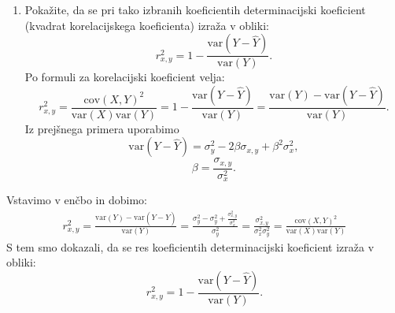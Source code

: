 \documentclass[a4paper]{article}
\begin{document}
\begin{enumerate}[label=(\alph*)]
\item Pokažite, da se pri tako izbranih koeficientih determinacijski koeficient (kvadrat korelacijskega koeficienta) izraža v obliki:
$$ r_{x,y}^2 = 1 - \frac{\text{var}(Y - \hat{Y})}{\text{var}(Y)}. $$
Po formuli za korelacijski koeficient velja:
$$ r_{x,y}^2 = \frac{\text{cov}(X,Y)^2}{\text{var}(X) \text{var}(Y)} = 1 - \frac{\text{var}(Y - \hat{Y})}{\text{var}(Y)} = \frac{\text{var}(Y) - \text{var}(Y - \hat{Y})}{\text{var}(Y)}. $$
Iz prejšnega primera uporabimo
$$ \text{var}(Y-\hat{Y}) = \sigma_y^2 - 2 \beta \sigma_{x,y} + \beta^2 \sigma_x^2,$$
$$ \beta = \frac{\sigma_{x,y}}{\sigma_x^2}.$$
\end{enumerate}
Vstavimo v enčbo in dobimo:
\begin{multline*}
 r_{x,y}^2 = \frac{\text{var}(Y) - \text{var}(Y - \hat{Y})}{\text{var}(Y)} = \frac{\sigma_y^2 - \sigma_y^2 + \frac{\sigma_{x,y}^2}{\sigma_x^2}}{\sigma_y^2} = \frac{\sigma_{x,y}^2}{\sigma_x^2 \sigma_y^2} =\frac{\text{cov}(X,Y)^2}{\text{var}(X) \text{var}(Y)}  
\end{multline*}
S tem smo dokazali, da se res koeficientih determinacijski koeficient izraža v obliki:
$$ r_{x,y}^2 = 1 - \frac{\text{var}(Y - \hat{Y})}{\text{var}(Y)}. $$
\end{document}
